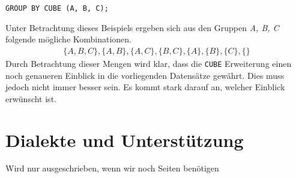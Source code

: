 \texttt{GROUP BY CUBE (A, B, C);}

Unter Betrachtung dieses Beispiels ergeben sich aus den Gruppen \textit{A, B, C}
folgende mögliche Kombinationen.
\begin{align*}
	\{ A, B, C\}, \{A, B\}, \{A, C\}, \{B, C\}, \{A\}, \{B\}, \{C\}, \{ \}
\end{align*}
Durch Betrachtung dieser Mengen wird klar, dass die \texttt{CUBE} Erweiterung einen
noch genaueren Einblick in die vorliegenden Datensätze gewährt. Dies muss jedoch
nicht immer besser sein. Es kommt stark darauf an, welcher Einblick erwünscht
ist.


\section{Dialekte und Unterstützung}
Wird nur ausgeschrieben, wenn wir noch Seiten benötigen